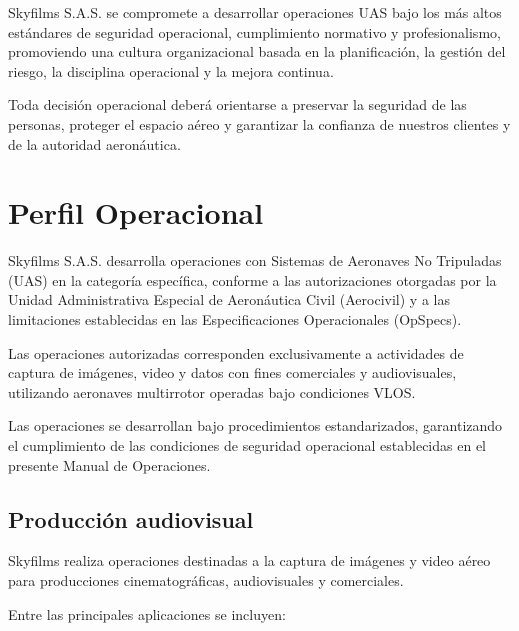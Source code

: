 \begin{tcolorbox}[title=Política Operacional de Skyfilms,colback=gray!5,colframe=black]

Skyfilms S.A.S. se compromete a desarrollar operaciones UAS bajo los más altos estándares de seguridad operacional, cumplimiento normativo y profesionalismo, promoviendo una cultura organizacional basada en la planificación, la gestión del riesgo, la disciplina operacional y la mejora continua.

Toda decisión operacional deberá orientarse a preservar la seguridad de las personas, proteger el espacio aéreo y garantizar la confianza de nuestros clientes y de la autoridad aeronáutica.

\end{tcolorbox}




\section{Perfil Operacional}

Skyfilms S.A.S. desarrolla operaciones con Sistemas de Aeronaves No Tripuladas (UAS) en la categoría específica, conforme a las autorizaciones otorgadas por la Unidad Administrativa Especial de Aeronáutica Civil (Aerocivil) y a las limitaciones establecidas en las Especificaciones Operacionales (OpSpecs).

Las operaciones autorizadas corresponden exclusivamente a actividades de captura de imágenes, video y datos con fines comerciales y audiovisuales, utilizando aeronaves multirrotor operadas bajo condiciones VLOS.

Las operaciones se desarrollan bajo procedimientos estandarizados, garantizando el cumplimiento de las condiciones de seguridad operacional establecidas en el presente Manual de Operaciones.


\subsection{Producción audiovisual}

Skyfilms realiza operaciones destinadas a la captura de imágenes y video aéreo para producciones cinematográficas, audiovisuales y comerciales.

Entre las principales aplicaciones se incluyen:

